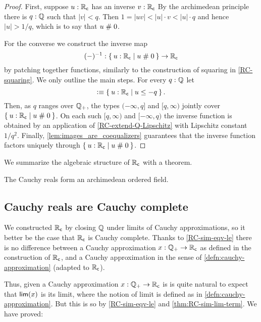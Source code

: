 \begin{proof}
  First, suppose $u : \mathbb{R}_\mathsf{c}$ has an inverse $v : \mathbb{R}_\mathsf{c}$ By the archimedean principle there is $q :
  \mathbb{Q}$ such that $|v| < q$. Then $1 = |u v| < |u| \cdot v < |u| \cdot q$ and hence $|u| >
  1/q$, which is to say that $u \mathrel{\#} 0$.

  For the converse we construct the inverse map
  \begin{equation*}
    ({-})^{-1} : \setof{ u : \RC | u \apart 0 } \to \RC
  \end{equation*}
  by patching together functions, similarly to the construction of squaring in
  \autoref{RC-squaring}. We only outline the main steps. For every $q : \mathbb{Q}$ let
  \begin{equation*}
    [q, \infty) \defeq \setof{u : \RC | q \leq u}
    \qquad\text{and}\qquad
    (-\infty, q] \defeq \setof{u : \RC | u \leq -q}.
  \end{equation*}
  Then, as $q$ ranges over $\mathbb{Q}_{+}$, the types $(-\infty, q]$ and $[q, \infty)$ jointly cover
  $\setof{u : \RC | u \apart 0}$. On each such $[q, \infty)$ and $[-\infty, q)$ the
  inverse function is obtained by an application of \autoref{RC-extend-Q-Lipschitz}
  with Lipschitz constant $1/q^2$. Finally, \autoref{lem:images_are_coequalizers}
  guarantees that the inverse function factors uniquely through $\setof{ u : \RC | u
    \apart 0 }$.
\end{proof}

We summarize the algebraic structure of $\mathbb{R}_\mathsf{c}$ with a theorem.

\begin{thm} \label{RC-archimedean-ordered-field}
  The Cauchy reals form an archimedean ordered field.
\end{thm}

\subsection{Cauchy reals are Cauchy complete}
\label{sec:cauchy-reals-cauchy-complete}

We constructed $\mathbb{R}_\mathsf{c}$ by closing $\mathbb{Q}$ under limits of Cauchy approximations, so it better
be the case that $\mathbb{R}_\mathsf{c}$ is Cauchy complete. Thanks to \autoref{RC-sim-eqv-le} there is no
difference between a Cauchy approximation $x : \mathbb{Q}_{+} \to \mathbb{R}_\mathsf{c}$ as defined in the construction
of $\mathbb{R}_\mathsf{c}$, and a Cauchy approximation in the sense of \autoref{defn:cauchy-approximation}
(adapted to $\mathbb{R}_\mathsf{c}$).

Thus, given a Cauchy approximation $x : \mathbb{Q}_{+} \to \mathbb{R}_\mathsf{c}$ is is quite natural to expect that
$\mathsf{lim}(x)$ is its limit, where the notion of limit is defined as in
\autoref{defn:cauchy-approximation}. But this is so by \autoref{RC-sim-eqv-le} and
\autoref{thm:RC-sim-lim-term}. We have proved:


